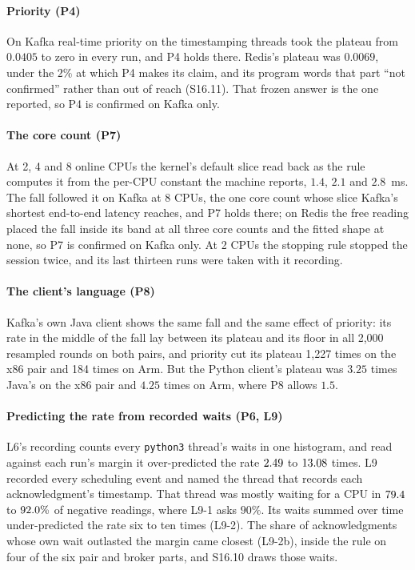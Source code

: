 \documentclass[10pt,journal,onecolumn]{IEEEtran}
\newcommand{\kafka}{Kafka}
\newcommand{\redis}{Redis}
\begin{document}
\paragraph{Priority (P4)} On \kafka{} real-time priority on the timestamping threads took the
plateau from $0.0405$ to zero in every run, and P4 holds there. \redis{}'s plateau was $0.0069$,
under the $2\%$ at which P4 makes its claim, and its program words that part ``not confirmed''
rather than out of reach (S16.11). That frozen answer is the one reported, so P4 is confirmed on
\kafka{} only.

\paragraph{The core count (P7)} At 2, 4 and 8 online CPUs the kernel's default slice read back as
the rule computes it from the per-CPU constant the machine reports, $1.4$, $2.1$ and $2.8$~ms. The
fall followed it on \kafka{} at 8 CPUs, the one core count whose slice \kafka{}'s shortest
end-to-end latency reaches, and P7 holds there; on \redis{} the free reading placed the fall inside its band
at all three core counts and the fitted shape at none, so P7 is confirmed on \kafka{} only. At 2 CPUs the stopping rule
stopped the session twice, and its last thirteen runs were taken with it recording.

\paragraph{The client's language (P8)} Kafka's own Java client shows the same fall and the same
effect of priority: its rate in the middle of the fall lay between its plateau and its floor in
all 2,000 resampled rounds on both pairs, and priority cut its plateau 1,227 times on the x86 pair
and 184 times on Arm. But the Python client's plateau was $3.25$ times Java's on the x86 pair and
$4.25$ times on Arm, where P8 allows $1.5$.

\paragraph{Predicting the rate from recorded waits (P6, L9)} L6's recording counts every
\texttt{python3} thread's waits in one histogram, and read against each run's margin it
over-predicted the rate $2.49$ to $13.08$ times. L9 recorded every scheduling event and named the
thread that records each acknowledgment's timestamp. That thread was mostly waiting for a CPU in
$79.4$ to $92.0\%$ of negative readings, where L9-1 asks $90\%$. Its waits summed over time
under-predicted the rate six to ten times (L9-2). The share of acknowledgments whose own wait
outlasted the margin came closest (L9-2b), inside the rule on four of the six pair and broker
parts, and S16.10 draws those waits.
\end{document}

